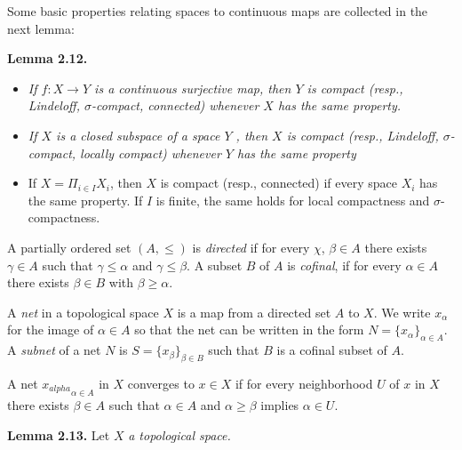 \documentclass[12pt]{article}
\begin{document}
                Some basic properties relating spaces to continuous maps are collected in the next lemma:



    \textbf{Lemma 2.12.} 

    
            \begin{itemize}

                \item \emph{If $ f : X \to Y $ is a continuous surjective map, then $ Y $ is compact (resp., Lindeloff, $\sigma$-compact,
                connected) whenever $ X $ has the same property.}
                    
                \item \emph{If $ X $ is a closed subspace of a space $ Y $ , then $ X $ is compact (resp., Lindeloff, $\sigma$-compact, locally compact)
                whenever $ Y $ has the same property}

                \item If $ X = \Pi_{i \in I} X_i $, then $ X $ is compact (resp., connected) if every space $ X_i $ has the same property. If $ I $ is
                finite, the same holds for local compactness and $\sigma$-compactness.
                    
            \end{itemize}

    
            A partially ordered set $ (A, \leq) $ is \emph{directed} if for every $ \chi $, $ \beta \in A $ there exists $ \gamma \in A $ such that $ \gamma \leq \alpha $ and $ \gamma \leq \beta $.
        A subset $ B $ of $ A $ is \emph{cofinal}, if for every $ \alpha \in A $ there exists $ \beta \in B $ with $ \beta \geq \alpha $.
        

            A \emph{net} in a topological space $ X $ is a map from a directed set $ A $ to $ X $. We write $ x_\alpha $ for the image of $ \alpha \in A $ so
        that the net can be written in the form $ N = \{x_{\alpha}\}_{\alpha \in A} $. A \emph{subnet} of a net $ N $ is $ S = \{x_{\beta}\}_{\beta \in B} $ such that $ B $ is a
        cofinal subset of $ A $.
        

            A net ${x_{alpha}}_{\alpha \in A}$ in $ X $ converges to $ x \in X $ if for every neighborhood $ U $ of $ x $ in $ X $ there exists $ \beta \in A $ such that
        $ \alpha \in A $ and $ \alpha \geq \beta $ implies $ \alpha \in U $.    
    
    
    \textbf{Lemma 2.13.} Let $ X $ \emph{a topological space.}
\end{document}
